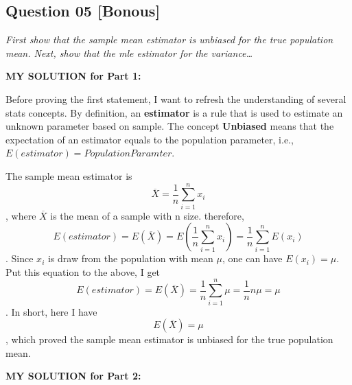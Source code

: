 \documentclass[
]{article}
\begin{document}
\hypertarget{question-05-bonous}{%
\subsection{Question 05 {[}Bonous{]}}\label{question-05-bonous}}

\emph{First show that the sample mean estimator is unbiased for the true
population mean. Next, show that the mle estimator for the
variance\ldots{}}

\textbf{MY SOLUTION for Part 1:}

Before proving the first statement, I want to refresh the understanding
of several stats concepts. By definition, an \textbf{estimator} is a
rule that is used to estimate an unknown parameter based on sample. The
concept \textbf{Unbiased} means that the expectation of an estimator
equals to the population parameter, i.e.,
\(E(estimator) = Population Paramter\).

The sample mean estimator is
\[\overline{X} = \frac{1}{n}\sum_{i = 1}^{n} x_{i}\], where
\(\overline{X}\) is the mean of a sample with n size. therefore,
\[E(estimator) = E(\overline{X})=E(\frac{1}{n}\sum_{i = 1}^{n} x_{i})= \frac{1}{n}\sum_{i = 1}^{n}E(x_i)\].
Since \(x_i\) is draw from the population with mean \(\mu\), one can
have \(E(x_i) = \mu\). Put this equation to the above, I get
\[E(estimator) = E(\overline{X}) = \frac{1}{n}\sum_{i = 1}^{n}\mu=\frac{1}{n}n\mu=\mu\].
In short, here I have \[E(\overline{X})= \mu\], which proved the sample
mean estimator is unbiased for the true population mean.

\textbf{MY SOLUTION for Part 2:}
\end{document}
